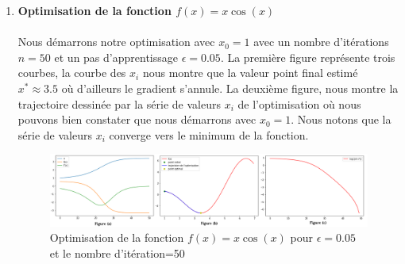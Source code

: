 \documentclass{report}
\begin{document}
\begin{enumerate}
	\item \textbf{Optimisation de la fonction $f(x)= x\cos(x)$}
	\paragraph{}
Nous démarrons notre optimisation avec $ x_{0}=1 $ avec un nombre d'itérations $n=50$ et un pas d'apprentissage $ \epsilon=0.05$. La première figure représente trois courbes, la courbe des $ x_{i} $ nous montre que la valeur point final estimé $x^* \approx 3.5$ où d'ailleurs le gradient s'annule. 
La deuxième figure, nous montre la trajectoire dessinée par la série de valeurs  $ x_{i}$ de l'optimisation où nous pouvons bien constater que nous démarrons avec $ x_{0}=1 $. Nous notons que la série de valeurs  $ x_{i}$ converge vers le minimum de la fonction.
 \begin{figure}[H]
 	\begin{center}
 		\includegraphics[width=1\textwidth]{f1.png}
 		\caption{Optimisation de la fonction $f(x)= x\cos(x)$ pour $\epsilon=0.05$ et le nombre d'itération=50}
 	\end{center}
 \end{figure}

\end{enumerate}
\end{document}
